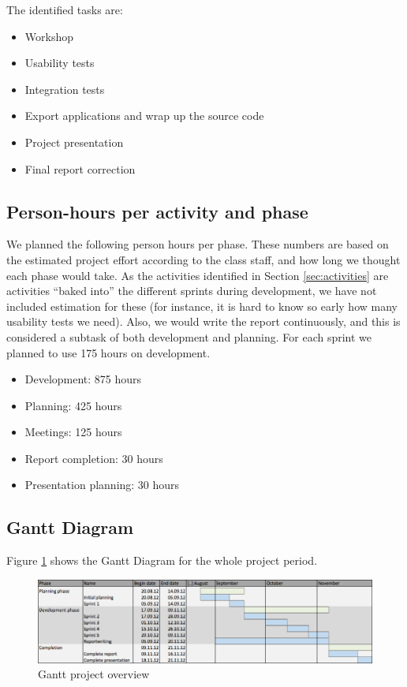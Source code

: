The identified tasks are:
\begin{itemize}
  \item Workshop
  \item Usability tests
  \item Integration tests
  \item Export applications and wrap up the source code
  \item Project presentation
  \item Final report correction
\end{itemize}

\subsection{Person-hours per activity and phase}
We planned the following person hours per phase. These numbers are based on the estimated project
effort according to the class staff, and how long we thought each phase would take. As the activities identified
in Section \ref{sec:activities} are activities ``baked into'' the different sprints during development, we have not included estimation for these 
(for instance, it is hard to know so early how many usability tests we need). Also, we would write the report continuously, 
and this is considered a subtask of both development and planning. For each sprint we planned to use 175 hours on development.
\begin{itemize}
  \item Development: 875 hours
  \item Planning: 425 hours
  \item Meetings: 125 hours
  \item Report completion: 30 hours
  \item Presentation planning: 30 hours
\end{itemize}

\subsection{Gantt Diagram}
Figure \ref{fig:gantt} shows the Gantt Diagram for the whole project period.
\begin{figure}
	\centering
		\includegraphics[width = 17.5 cm]{Pictures/ArchPictures/Gantt.png}
	\caption{Gantt project overview}
	\label{fig:gantt}
\end{figure}